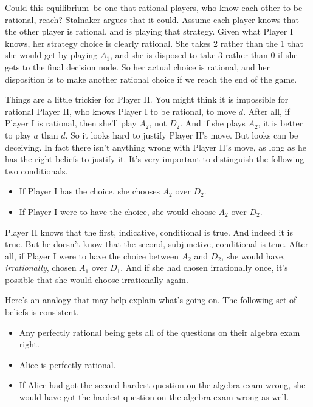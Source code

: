 \documentclass[
  11pt,
  letterpaper,
]{scrbook}
\providecommand{\tightlist}{%
  \setlength{\itemsep}{0pt}\setlength{\parskip}{0pt}}
\begin{document}
Could this equilibrium~be one that rational players, who know each other
to be rational, reach? Stalnaker argues that it could. Assume each
player knows that the other player is rational, and is playing that
strategy. Given what Player I knows, her strategy choice is clearly
rational. She takes 2 rather than the 1 that she would get by playing
\(A_1\), and she is disposed to take 3 rather than 0 if she gets to the
final decision node. So her actual choice is rational, and her
disposition is to make another rational choice if we reach the end of
the game.

Things are a little trickier for Player II. You might think it is
impossible for rational Player II, who knows Player I to be rational, to
move \(d\). After all, if Player I is rational, then she'll play
\(A_2\), not \(D_2\). And if she plays \(A_2\), it is better to play
\(a\) than \(d\). So it looks hard to justify Player II's move. But
looks can be deceiving. In fact there isn't anything wrong with Player
II's move, as long as he has the right beliefs to justify it. It's very
important to distinguish the following two conditionals.

\begin{itemize}
\tightlist
\item
  If Player I has the choice, she chooses \(A_2\) over \(D_2\).
\item
  If Player I were to have the choice, she would choose \(A_2\) over
  \(D_2\).
\end{itemize}

Player II knows that the first, indicative, conditional is true. And
indeed it is true. But he doesn't know that the second, subjunctive,
conditional is true. After all, if Player I were to have the choice
between \(A_2\) and \(D_2\), she would have, \emph{irrationally}, chosen
\(A_1\) over \(D_1\). And if she had chosen irrationally once, it's
possible that she would choose irrationally again.

Here's an analogy that may help explain what's going on. The following
set of beliefs is consistent.

\begin{itemize}
\tightlist
\item
  Any perfectly rational being gets all of the questions on their
  algebra exam right.
\item
  Alice is perfectly rational.
\item
  If Alice had got the second-hardest question on the algebra exam
  wrong, she would have got the hardest question on the algebra exam
  wrong as well.
\end{itemize}
\end{document}
